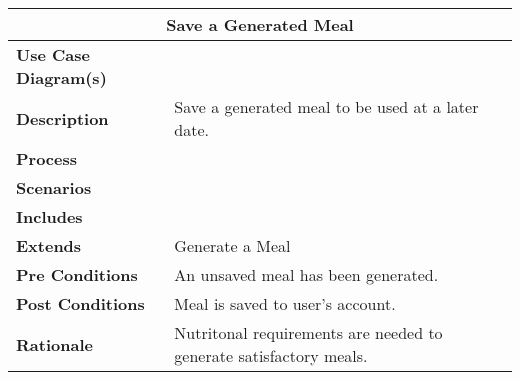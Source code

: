 \documentclass[12pt]{article}
\begin{document}
\begin{center}
\begin{tabularx}{\textwidth}{ |X|X|}
\hline
\multicolumn{2}{|c|}{\textbf{Save a Generated Meal}}\\
\hline
\hline
\textbf{Use Case Diagram(s)} & \\ \hline
\textbf{Description} & Save a generated meal to be used at a later date.\\ \hline
\textbf{Process} & \\ \hline
\textbf{Scenarios} & \\ \hline
\textbf{Includes} & \\ \hline
\textbf{Extends} & Generate a Meal  \\ \hline
\textbf{Pre Conditions} & An unsaved meal has been generated.\\ \hline
\textbf{Post Conditions} & Meal is saved to user's account.\\ \hline
\textbf{Rationale} & Nutritonal requirements are needed to generate satisfactory meals.\\ \hline
\end{tabularx}
\end{center}
\end{document}
